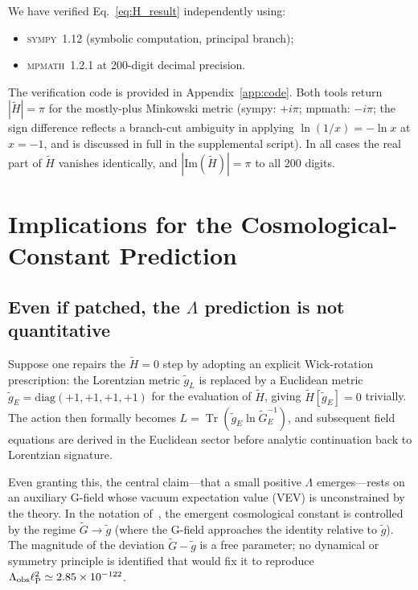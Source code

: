 \documentclass[aps,prd,twocolumn,preprintnumbers,superscriptaddress]{revtex4-2}
\newcommand{\tg}{\tilde{g}}
\newcommand{\tG}{\tilde{G}}
\newcommand{\tr}{\operatorname{Tr}}
\newcommand{\lP}{\ell_{\rm P}}
\newcommand{\Lobs}{\Lambda_{\rm obs}}
\newcommand{\iunit}{i}
\begin{document}
We have verified Eq.~\eqref{eq:H_result} independently using:
\begin{itemize}
  \item \textsc{sympy}~1.12 (symbolic computation, principal branch);
  \item \textsc{mpmath}~1.2.1 at 200-digit decimal precision.
\end{itemize}
The verification code is provided in Appendix~\ref{app:code}.
Both tools return $|\tilde{H}| = \pi$ for the mostly-plus
Minkowski metric (sympy: $+\iunit\pi$; mpmath: $-\iunit\pi$; the sign
difference reflects a branch-cut ambiguity in applying $\ln(1/x) = -\ln x$
at $x=-1$, and is discussed in full in the supplemental script).
In all cases the real part of $\tilde{H}$ vanishes identically, and
$|\mathrm{Im}(\tilde{H})| = \pi$ to all 200 digits.

\section{Implications for the Cosmological-Constant Prediction}
\label{sec:Lambda}

\subsection{Even if patched, the $\Lambda$ prediction is not quantitative}

Suppose one repairs the $\tilde{H}=0$ step by adopting an explicit
Wick-rotation prescription: the Lorentzian metric $\tg_L$ is replaced by
a Euclidean metric $\tg_E = \mathrm{diag}(+1,+1,+1,+1)$ for the
evaluation of $\tilde{H}$, giving $\tilde{H}[\tg_E]=0$ trivially.
The action then formally becomes $L = \tr(\tg_E\ln\tG_E^{-1})$, and
subsequent field equations are derived in the Euclidean sector before
analytic continuation back to Lorentzian signature.

Even granting this, the central claim---that a small positive $\Lambda$
emerges---rests on an auxiliary G-field whose vacuum expectation value
(VEV) is unconstrained by the theory.  In the notation of~\cite{Bianconi2025},
the emergent cosmological constant is controlled by the regime
$\tG \to \tg$ (where the G-field approaches the identity relative to $\tg$).
The magnitude of the deviation $\tG - \tg$ is a free parameter; no
dynamical or symmetry principle is identified that would fix it to
reproduce $\Lobs\lP^2 \simeq 2.85\times 10^{-122}$.
\end{document}
